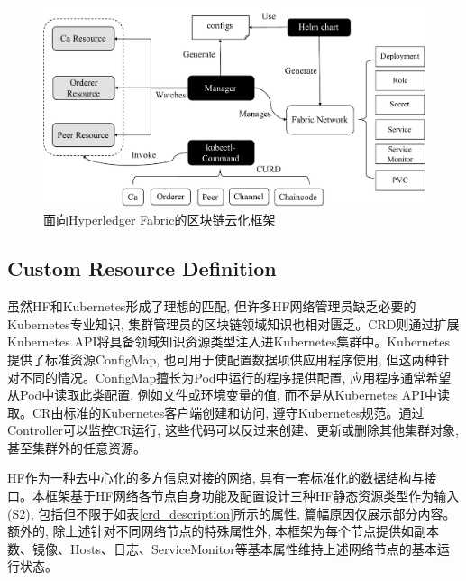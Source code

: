 \begin{figure}[h] %
    \centering %
    \includegraphics[width=1.0\textwidth]{FIGs/chapter4/framework.pdf} %
    \caption{面向Hyperledger Fabric的区块链云化框架} %
    \label{framework} %
\end{figure}%

\subsection{Custom Resource Definition}\label{section: Custom_Resource_Definition}

虽然HF和Kubernetes形成了理想的匹配, 但许多HF网络管理员缺乏必要的Kubernetes专业知识, 集群管理员的区块链领域知识也相对匮乏。CRD则通过扩展Kubernetes API将具备领域知识资源类型注入进Kubernetes集群中。Kubernetes提供了标准资源ConfigMap, 也可用于使配置数据项供应用程序使用, 但这两种针对不同的情况。ConfigMap擅长为Pod中运行的程序提供配置, 应用程序通常希望从Pod中读取此类配置, 例如文件或环境变量的值, 而不是从Kubernetes API中读取。CR由标准的Kubernetes客户端创建和访问, 遵守Kubernetes规范。通过Controller可以监控CR运行, 这些代码可以反过来创建、更新或删除其他集群对象, 甚至集群外的任意资源。

HF作为一种去中心化的多方信息对接的网络, 具有一套标准化的数据结构与接口。本框架基于HF网络各节点自身功能及配置\footnotemark[1]\footnotemark[2]\footnotemark[3]设计三种HF静态资源类型作为输入(S2), 包括但不限于如表\ref{crd_description}所示的属性, 篇幅原因仅展示部分内容。额外的, 除上述针对不同网络节点的特殊属性外, 本框架为每个节点提供如副本数、镜像、Hosts、日志、ServiceMonitor等基本属性维持上述网络节点的基本运行状态。

